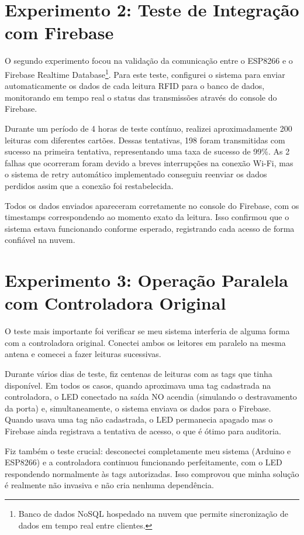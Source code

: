 \section{Experimento 2: Teste de Integração com Firebase}

O segundo experimento focou na validação da comunicação entre o ESP8266 e o Firebase Realtime Database\footnote{Banco de dados NoSQL hospedado na nuvem que permite sincronização de dados em tempo real entre clientes.}. Para este teste, configurei o sistema para enviar automaticamente os dados de cada leitura RFID para o banco de dados, monitorando em tempo real o status das transmissões através do console do Firebase.

Durante um período de 4 horas de teste contínuo, realizei aproximadamente 200 leituras com diferentes cartões. Dessas tentativas, 198 foram transmitidas com sucesso na primeira tentativa, representando uma taxa de sucesso de 99\%. As 2 falhas que ocorreram foram devido a breves interrupções na conexão Wi-Fi, mas o sistema de retry automático implementado conseguiu reenviar os dados perdidos assim que a conexão foi restabelecida.

Todos os dados enviados apareceram corretamente no console do Firebase, com os timestamps correspondendo ao momento exato da leitura. Isso confirmou que o sistema estava funcionando conforme esperado, registrando cada acesso de forma confiável na nuvem.

\section{Experimento 3: Operação Paralela com Controladora Original}

O teste mais importante foi verificar se meu sistema interferia de alguma forma com a controladora original. Conectei ambos os leitores em paralelo na mesma antena e comecei a fazer leituras sucessivas.

Durante vários dias de teste, fiz centenas de leituras com as tags que tinha disponível. Em todos os casos, quando aproximava uma tag cadastrada na controladora, o LED conectado na saída NO acendia (simulando o destravamento da porta) e, simultaneamente, o sistema enviava os dados para o Firebase. Quando usava uma tag não cadastrada, o LED permanecia apagado mas o Firebase ainda registrava a tentativa de acesso, o que é ótimo para auditoria.

Fiz também o teste crucial: desconectei completamente meu sistema (Arduino e ESP8266) e a controladora continuou funcionando perfeitamente, com o LED respondendo normalmente às tags autorizadas. Isso comprovou que minha solução é realmente não invasiva e não cria nenhuma dependência.

